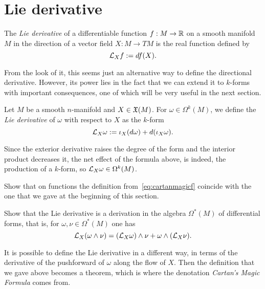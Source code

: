 \section{Lie derivative}

\begin{definition}
The \emph{Lie derivative} of a differentiable function $f:M\to\mathbb{R}$ on a smooth manifold $M$ in the direction of a vector field $X:M\to TM$ is the real function defined by
\begin{equation}
  \mathcal{L}_X f := df(X).
\end{equation}
\end{definition}

From the look of it, this seems just an alternative way to define the directional derivative.
However, its power lies in the fact that we can extend it to $k$-forms with important consequences, one of which will be very useful in the next section.

\begin{definition}
  Let $M$ be a smooth $n$-manifold and $X\in\mathfrak{X}(M)$.
  For $\omega\in\Omega^k(M)$, we define the \emph{Lie derivative} of $\omega$ with respect to $X$ as the $k$-form
  \begin{equation}\label{eq:cartanmagicf}
    \mathcal{L}_X\omega := \iota_X (d\omega) + d(\iota_X\omega).
  \end{equation}
\end{definition}

Since the exterior derivative raises the degree of the form and the interior product decreases it, the net effect of the formula above, is indeed, the production of a $k$-form, so $\mathcal{L}_X\omega \in \Omega^k(M)$.

\begin{exercise}
  Show that on functions the definition from~\eqref{eq:cartanmagicf} coincide with the one that  we gave at the beginning of this section.
\end{exercise}

\begin{exercise}\label{exe:liederandwedge}
Show that the Lie derivative is a derivation in the algebra $\Omega^*(M)$ of differential forms, that is, for $\omega,\nu\in\Omega^*(M)$ one has
\begin{equation}
  \mathcal{L}_X(\omega\wedge\nu) = (\mathcal{L}_X\omega)\wedge\nu + \omega\wedge(\mathcal{L}_X \nu).
\end{equation}
\end{exercise}

It is possible to define the Lie derivative in a different way, in terms of the derivative of the pushforward of $\omega$ along the flow of $X$.
Then the definition that we gave above becomes a theorem, which is where the denotation \emph{Cartan's Magic Formula} comes from.

